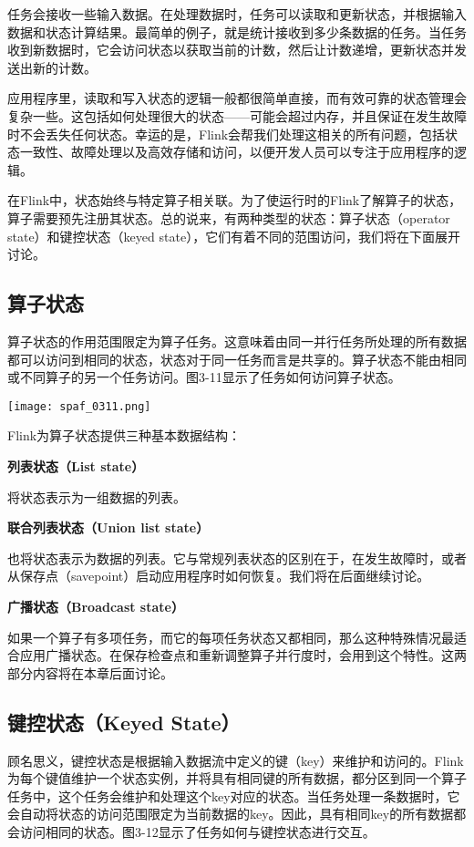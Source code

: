 \documentclass[oneside]{ctexbook}
\begin{document}
任务会接收一些输入数据。在处理数据时，任务可以读取和更新状态，并根据输入数据和状态计算结果。最简单的例子，就是统计接收到多少条数据的任务。当任务收到新数据时，它会访问状态以获取当前的计数，然后让计数递增，更新状态并发送出新的计数。

应用程序里，读取和写入状态的逻辑一般都很简单直接，而有效可靠的状态管理会复杂一些。这包括如何处理很大的状态——可能会超过内存，并且保证在发生故障时不会丢失任何状态。幸运的是，Flink会帮我们处理这相关的所有问题，包括状态一致性、故障处理以及高效存储和访问，以便开发人员可以专注于应用程序的逻辑。

在Flink中，状态始终与特定算子相关联。为了使运行时的Flink了解算子的状态，算子需要预先注册其状态。总的说来，有两种类型的状态：算子状态（operator state）和键控状态（keyed state），它们有着不同的范围访问，我们将在下面展开讨论。

\subsection{算子状态}

算子状态的作用范围限定为算子任务。这意味着由同一并行任务所处理的所有数据都可以访问到相同的状态，状态对于同一任务而言是共享的。算子状态不能由相同或不同算子的另一个任务访问。图3-11显示了任务如何访问算子状态。

\noindent \texttt{[image: spaf\_0311.png]}

Flink为算子状态提供三种基本数据结构：

\textbf{列表状态（List state）}

将状态表示为一组数据的列表。

\textbf{联合列表状态（Union list state）}

也将状态表示为数据的列表。它与常规列表状态的区别在于，在发生故障时，或者从保存点（savepoint）启动应用程序时如何恢复。我们将在后面继续讨论。

\textbf{广播状态（Broadcast state）}

如果一个算子有多项任务，而它的每项任务状态又都相同，那么这种特殊情况最适合应用广播状态。在保存检查点和重新调整算子并行度时，会用到这个特性。这两部分内容将在本章后面讨论。

\subsection{键控状态（Keyed State）}

顾名思义，键控状态是根据输入数据流中定义的键（key）来维护和访问的。Flink为每个键值维护一个状态实例，并将具有相同键的所有数据，都分区到同一个算子任务中，这个任务会维护和处理这个key对应的状态。当任务处理一条数据时，它会自动将状态的访问范围限定为当前数据的key。因此，具有相同key的所有数据都会访问相同的状态。图3-12显示了任务如何与键控状态进行交互。
\end{document}
